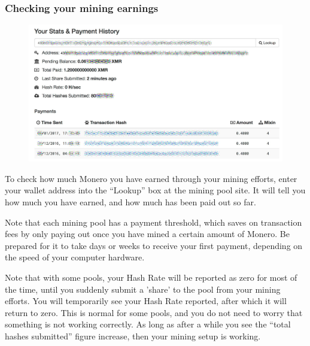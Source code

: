 \subsubsection{Checking your mining earnings}
	\begin{figure}[htbp!]
		\centering
		\includegraphics[width=0.8\linewidth]{./images/manual/mining-payments.jpg}
	\end{figure}
	To check how much Monero you have earned through your mining efforts, enter your wallet address into the ``Lookup'' box at the mining pool site. It will tell you how much you have earned, and how much has been paid out so far. \par
	Note that each mining pool has a payment threshold, which saves on transaction fees by only paying out once you have mined a certain amount of Monero. Be prepared for it to take days or weeks to receive your first payment, depending on the speed of your computer hardware. \par
	Note that with some pools, your Hash Rate will be reported as zero for most of the time, until you suddenly submit a 'share' to the pool from your mining efforts. You will temporarily see your Hash Rate reported, after which it will return to zero. This is normal for some pools, and you do not need to worry that something is not working correctly. As long as after a while you see the ``total hashes submitted'' figure increase, then your mining setup is working.
